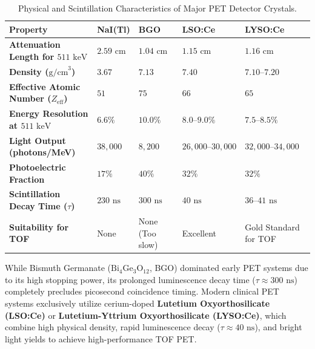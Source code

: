 \documentclass[11pt,a4paper]{article}
\begin{document}
\begin{table}[htbp]
\centering
\small
\setlength{\tabcolsep}{3pt}
\caption{Physical and Scintillation Characteristics of Major PET Detector Crystals.}
\label{tab:pet_crystals}
\begin{tabular}{p{2.6cm} p{2.2cm} p{2.2cm} p{2.8cm} p{4.2cm}}
\toprule
\textbf{Property} & \textbf{NaI(Tl)} & \textbf{BGO} & \textbf{LSO:Ce} & \textbf{LYSO:Ce} \\
\midrule
\textbf{Attenuation Length for $511\text{ keV}$} & $2.59\text{ cm}$ & $1.04\text{ cm}$ & $1.15\text{ cm}$ & $1.16\text{ cm}$ \\
\addlinespace
\textbf{Density ($\text{g/cm}^3$)} & $3.67$ & $7.13$ & $7.40$ & $7.10\text{--}7.20$ \\
\addlinespace
\textbf{Effective Atomic Number ($Z_{\text{eff}}$)} & $51$ & $75$ & $66$ & $65$ \\
\addlinespace
\textbf{Energy Resolution at $511\text{ keV}$} & $6.6\%$ & $10.0\%$ & $8.0\text{--}9.0\%$ & $7.5\text{--}8.5\%$ \\
\addlinespace
\textbf{Light Output (photons/MeV)} & $38,000$ & $8,200$ & $26,000\text{--}30,000$ & $32,000\text{--}34,000$ \\
\addlinespace
\textbf{Photoelectric Fraction} & $17\%$ & $40\%$ & $32\%$ & $32\%$ \\
\addlinespace
\textbf{Scintillation Decay Time ($\tau$)} & $230\text{ ns}$ & $300\text{ ns}$ & $40\text{ ns}$ & $36\text{--}41\text{ ns}$ \\
\addlinespace
\textbf{Suitability for TOF} & None & None (Too slow) & Excellent & Gold Standard for TOF \\
\bottomrule
\end{tabular}
\end{table}

While Bismuth Germanate ($\text{Bi}_4\text{Ge}_3\text{O}_{12}$, BGO) dominated early PET systems due to its high stopping power, its prolonged luminescence decay time ($\tau \approx 300\text{ ns}$) completely precludes picosecond coincidence timing. Modern clinical PET systems exclusively utilize cerium-doped \textbf{Lutetium Oxyorthosilicate (LSO:Ce)} or \textbf{Lutetium-Yttrium Oxyorthosilicate (LYSO:Ce)}, which combine high physical density, rapid luminescence decay ($\tau \approx 40\text{ ns}$), and bright light yields to achieve high-performance TOF PET.
\end{document}
